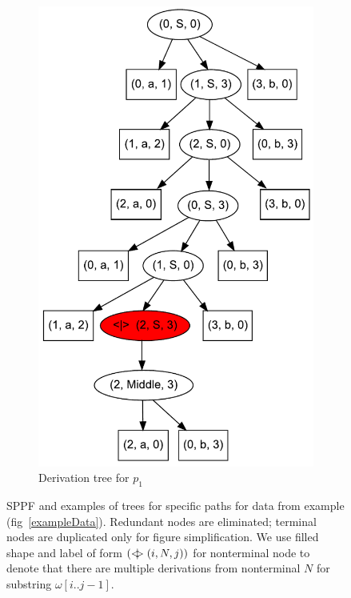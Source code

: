 \begin{figure}[ht]
\begin{center}
\begin{subfigure}[b]{0.3\textwidth}
        \includegraphics[width=\textwidth]{dot/AnBn_1.pdf}
        \caption{Derivation tree  for $p_1$}
        \label{tree2}        
    \end{subfigure}
    \caption{SPPF and examples of trees for specific paths for data from example (fig~\ref{exampleData}). Redundant nodes are eliminated; terminal nodes are duplicated only for figure simplification.
    We use filled shape and label of form $(<\mkern-11mu | \mkern-11mu> (i, N, j))$ for nonterminal node to denote that there are multiple derivations from nonterminal $N$ for substring $\omega[i..j-1]$.	
}
    \label{sppfSample}
    \end{center}                
\end{figure}

